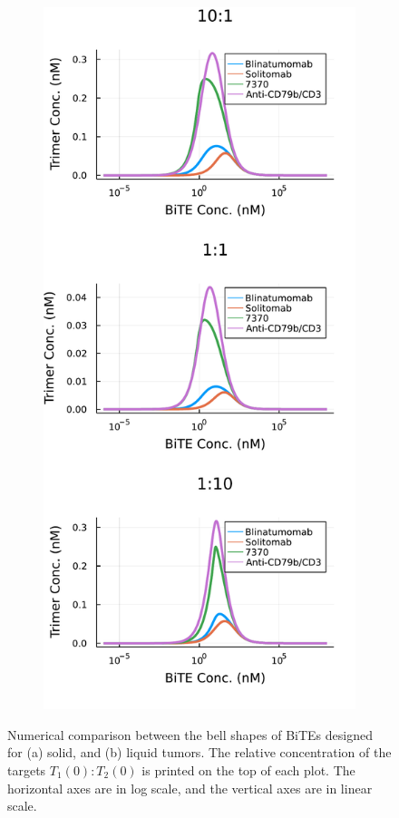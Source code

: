 \begin{figure}
\begin{subfigure}[b]{0.48\textwidth}
		\caption{}
		\label{fig:7}
	\end{subfigure} 
	\begin{subfigure}[b]{0.48\textwidth}
		\centering
		\includegraphics[width=1\textwidth]{fig/liquid.pdf}
		\caption{}
		\label{fig:8}
	\end{subfigure}
	\caption[Comparison of bell-shapes]{Numerical comparison between the bell shapes of \ac{BiTE}s designed for (a) solid, and (b) liquid tumors. The relative concentration of the targets $T_1(0):T_2(0)$ is printed on the top of each plot. The horizontal axes are in log scale, and the vertical axes are in linear scale.} 
	\label{fig:res1}
\end{figure}

